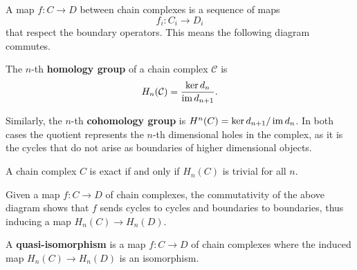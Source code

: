 \documentclass[twoside,10pt]{article}
\begin{document}
A map $f:C\to D$ between chain complexes is a sequence of maps \[f_i:C_i\to D_i\] that respect the boundary operators. This means the following diagram commutes.
\begin{center}
\end{center}

\begin{defn}[]
The $n$-th \textbf{homology group} of a chain complex $\mathcal{C}$ is
\[
	H_{n}(\mathcal{C}) = \frac{\ker d_{n}}{\operatorname{im} d_{n+1}} .
\] 
\end{defn}

Similarly, the $n$-th \textbf{cohomology group} is $H^{n}(C) = \ker d_{n+1}/\operatorname{im} d_{n}$. In both cases the quotient represents the $n$-th dimensional holes in the complex, as it is the cycles that do not arise as boundaries of higher dimensional objects.

A chain complex $C$ is exact if and only if $H_{n}(C)$ is trivial for all $n$.

Given a map $f:C \to D$ of chain complexes, the commutativity of the above diagram shows that $f$ sends cycles to cycles and boundaries to boundaries, thus inducing a map $H_{n}(C) \to H_{n}(D)$.

\begin{defn}[]
	A \textbf{quasi-isomorphism} is a map $f:C\to D$ of chain complexes where the induced map $H_{n}(C)\to H_{n}(D)$ is an isomorphism.
\end{defn}
\end{document}
